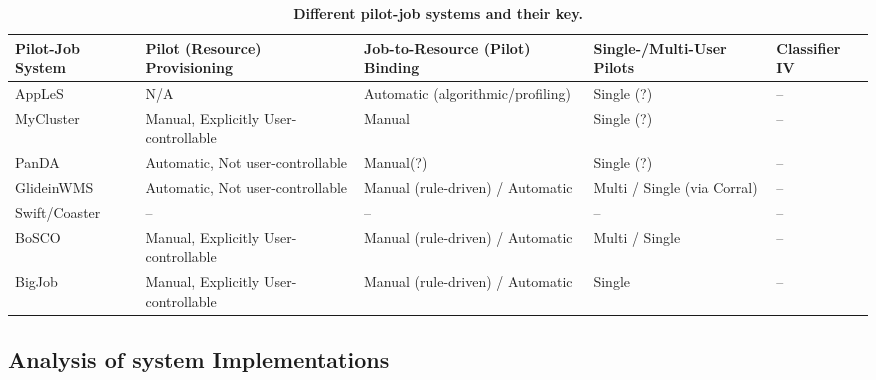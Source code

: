 \documentclass{sig-alternate}
\begin{document}
\begin{table}[t]
 \up
 \centering
 \begin{tabular}{|p{3cm}|p{3.2cm}|p{3cm}|p{3cm}|p{3cm}|}
  \hline
  \textbf{Pilot-Job System} &\textbf{Pilot (Resource) Provisioning}    &\textbf{Job-to-Resource (Pilot) Binding}  &\textbf{Single-/Multi-User Pilots} &\textbf{Classifier IV}  \\
  \hline
          AppLeS            & N/A                                      & Automatic (algorithmic/profiling)  & Single (?) & --                     \\
  \hline
          MyCluster         & Manual, Explicitly User-controllable     & Manual                             & Single (?)                  & --                     \\
  \hline
          PanDA             & Automatic, Not user-controllable         & Manual(?)                          & Single (?)      & --                     \\
  \hline
          GlideinWMS        & Automatic, Not user-controllable         & Manual (rule-driven) / Automatic   & Multi / Single (via Corral) & --                     \\
  \hline
          Swift/Coaster     & --                                       & --                                 & --                          & --                     \\
 \hline
          BoSCO             & Manual, Explicitly User-controllable     & Manual (rule-driven) / Automatic   & Multi / Single              & --                     \\
 \hline
          BigJob             & Manual, Explicitly User-controllable     & Manual (rule-driven) / Automatic   & Single              & --                     \\
 \hline
 \end{tabular}
 \caption{\textbf{Different pilot-job systems and their key.
 }
 \up}
 \label{table:implementations-comparison}
\end{table}

\subsection{Analysis of \pilot system Implementations}
\end{document}
